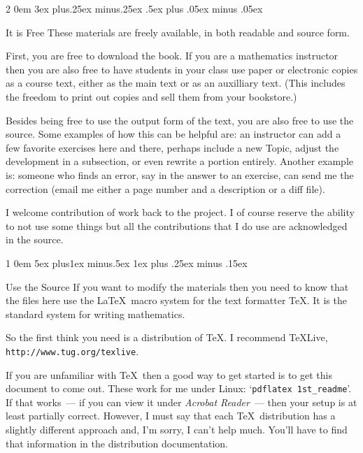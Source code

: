 \documentclass[titlepage]{article}
\makeatletter
\renewcommand{\section}{\@startsection{section}%
  {1}%
  {0em}%
  {5ex plus1ex minus.5ex}%
  {1ex plus .25ex minus .15ex}%
  {\large\bfseries\raggedright}}
\renewcommand{\subsection}{\@startsection{subsection}%
  {2}%
  {0em}%
  {3ex plus.25ex minus.25ex}%
  {.5ex plus .05ex minus .05ex}%
  {\bfseries\raggedright}}
\makeatother
\begin{document}
\subsection{It is Free}
These materials are freely available, in both readable and source form.

First, you are free to download the book.
If you are a mathematics
instructor then you are also free to have students in your class 
use paper or electronic copies as a course text,
either as the main text or as an auxilliary text. 
(This includes the freedom to print out copies and sell them
from your bookstore.)

Besides being free to use the output form of the text, you are
also free to use the source.
Some examples of how this can be helpful are:
an instructor can add a few favorite exercises 
here and there, perhaps include a new Topic, adjust the development
in a subsection, or even rewrite a portion entirely.
Another example is: someone who finds an error, say in the answer to an
exercise, can send me the correction (email me either a page number and a
description or a diff file).

I welcome contribution of work back to the project.
I of course reserve the ability to not use some things but all
the contributions that I do use are acknowledged in the source.














\section{Use the Source}
If you want to modify the materials then 
you need to know that the files here
use the \LaTeX\ macro system for the text formatter \TeX. 
It is the 
standard system for writing mathematics.

So the first think you need is a
distribution of \TeX. 
I recommend \TeX{}Live, \texttt{http://www.tug.org/texlive}. 

If you are unfamiliar with \TeX\ then 
a good way to get started is to get this document to come out.  
These work for me under Linux:
`\verb!pdflatex 1st_readme!'. 
If that works~--- if you can view it under \textit{Acrobat Reader}~--- then 
your setup is at least partially correct. 
However, I must say that each \TeX\ distribution 
has a slightly different approach and, I'm sorry, I can't help much.
You'll have to find that information in the distribution
documentation.
\end{document}
